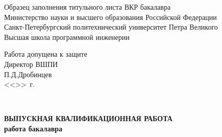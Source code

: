 \begin{titlepage}

  \begin{center} %



    Образец заполнения титульного листа ВКР бакалавра\\
    Министерство науки и высшего образования Российской Федерации\\
    Санкт-Петербургский политехнический университет Петра Великого\\
    Высшая школа программной инженерии\\[0.8cm]

    \newlength{\charwidth}
    \setlength{\charwidth}{\widthof{\_}}

    \begin{flushright}
      \begin{minipage}{0.505\linewidth}
          Работа допущена к защите                                                               \\
          Директор ВШПИ                                                                          \\
          \underline{\hspace*{11\charwidth}} П.Д.Дробинцев                                   \\
          <<\underline{\hspace*{3\charwidth}}>>\underline{\hspace*{15\charwidth}}\the\year{}~г.
      \end{minipage}\\
    \end{flushright}

    {\Large \bfseries ВЫПУСКНАЯ КВАЛИФИКАЦИОННАЯ РАБОТА}\\[0.66\baselineskip]
    {\Large \bfseries работа бакалавра}\\[2\baselineskip]


    {\Large \bfseries \MakeUppercase{\Theme}}\\[0.4cm] %


\end{center}
\end{titlepage}
